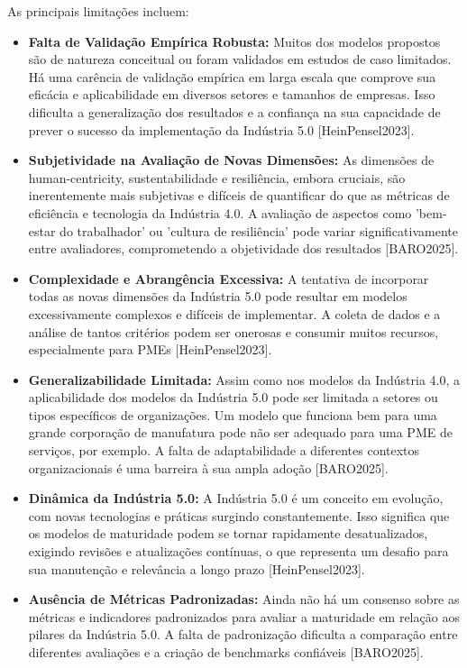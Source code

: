 As principais limitações incluem:
\begin{itemize}
    \item \textbf{Falta de Validação Empírica Robusta:} Muitos dos modelos propostos são de natureza conceitual ou foram validados em estudos de caso limitados. Há uma carência de validação empírica em larga escala que comprove sua eficácia e aplicabilidade em diversos setores e tamanhos de empresas. Isso dificulta a generalização dos resultados e a confiança na sua capacidade de prever o sucesso da implementação da Indústria 5.0 [HeinPensel2023].
    \item \textbf{Subjetividade na Avaliação de Novas Dimensões:} As dimensões de human-centricity, sustentabilidade e resiliência, embora cruciais, são inerentemente mais subjetivas e difíceis de quantificar do que as métricas de eficiência e tecnologia da Indústria 4.0. A avaliação de aspectos como 'bem-estar do trabalhador' ou 'cultura de resiliência' pode variar significativamente entre avaliadores, comprometendo a objetividade dos resultados [BARO2025].
    \item \textbf{Complexidade e Abrangência Excessiva:} A tentativa de incorporar todas as novas dimensões da Indústria 5.0 pode resultar em modelos excessivamente complexos e difíceis de implementar. A coleta de dados e a análise de tantos critérios podem ser onerosas e consumir muitos recursos, especialmente para PMEs [HeinPensel2023].
    \item \textbf{Generalizabilidade Limitada:} Assim como nos modelos da Indústria 4.0, a aplicabilidade dos modelos da Indústria 5.0 pode ser limitada a setores ou tipos específicos de organizações. Um modelo que funciona bem para uma grande corporação de manufatura pode não ser adequado para uma PME de serviços, por exemplo. A falta de adaptabilidade a diferentes contextos organizacionais é uma barreira à sua ampla adoção [BARO2025].
    \item \textbf{Dinâmica da Indústria 5.0:} A Indústria 5.0 é um conceito em evolução, com novas tecnologias e práticas surgindo constantemente. Isso significa que os modelos de maturidade podem se tornar rapidamente desatualizados, exigindo revisões e atualizações contínuas, o que representa um desafio para sua manutenção e relevância a longo prazo [HeinPensel2023].
    \item \textbf{Ausência de Métricas Padronizadas:} Ainda não há um consenso sobre as métricas e indicadores padronizados para avaliar a maturidade em relação aos pilares da Indústria 5.0. A falta de padronização dificulta a comparação entre diferentes avaliações e a criação de benchmarks confiáveis [BARO2025].
\end{itemize}

